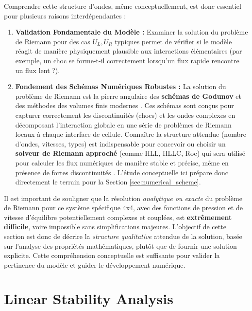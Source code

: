 Comprendre cette structure d'ondes, même conceptuellement, est donc essentiel pour plusieurs raisons interdépendantes :
\begin{enumerate}
    \item \textbf{Validation Fondamentale du Modèle :} Examiner la solution du problème de Riemann pour des cas \(U_L, U_R\) typiques permet de vérifier si le modèle réagit de manière physiquement plausible aux interactions élémentaires (par exemple, un choc se forme-t-il correctement lorsqu'un flux rapide rencontre un flux lent ?).
    \item \textbf{Fondement des Schémas Numériques Robustes :} La solution du problème de Riemann est la pierre angulaire des \textbf{schémas de Godunov} et des méthodes des volumes finis modernes \cite{LeVeque2002}. Ces schémas sont conçus pour capturer correctement les discontinuités (chocs) et les ondes complexes en décomposant l'interaction globale en une série de problèmes de Riemann locaux à chaque interface de cellule. Connaître la structure attendue (nombre d'ondes, vitesses, types) est indispensable pour concevoir ou choisir un \textbf{solveur de Riemann approché} (comme HLL, HLLC, Roe) qui sera utilisé pour calculer les flux numériques de manière stable et précise, même en présence de fortes discontinuités \cite{MammarEtAl2009}. L'étude conceptuelle ici prépare donc directement le terrain pour la Section \ref{sec:numerical_scheme}.
\end{enumerate}

Il est important de souligner que la résolution \textit{analytique ou exacte} du problème de Riemann pour ce système spécifique 4x4, avec des fonctions de pression et de vitesse d'équilibre potentiellement complexes et couplées, est \textbf{extrêmement difficile}, voire impossible sans simplifications majeures. L'objectif de cette section est donc de décrire la \textit{structure qualitative} attendue de la solution, basée sur l'analyse des propriétés mathématiques, plutôt que de fournir une solution explicite. Cette compréhension conceptuelle est suffisante pour valider la pertinence du modèle et guider le développement numérique.


\section{Linear Stability Analysis}
\label{sec:linear_stability}

